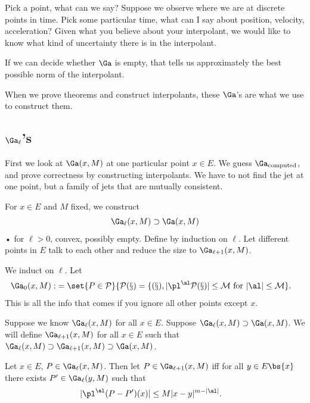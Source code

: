Pick a point, what can we say? Suppose we observe where we are at discrete points in time. Pick some particular time, what can I say about position, velocity, acceleration? %
Given what you believe about your interpolant, we would like to know what kind of uncertainty there is in the interpolant. 

If we can decide whether $\Ga$ is empty, that tells us approximately the best possible norm of the interpolant.

When we prove theorems and construct interpolants, these $\Ga$'s are what we use to construct them. 

\subsection{$\Ga_\ell$'s}

First we look at $\Ga(x,M)$ at one particular point $x\in E$. We guess $\Ga_{\text{computed}}$, and prove correctness by constructing interpolants. We have to not find the jet at one point, but a family of jets that are mutually consistent.

For $x\in E$ and $M$ fixed, we construct
\begin{align}
\Ga_\ell(x,M)\supset \Ga(x,M) 
\end{align}•
for $\ell>0$, convex, possibly empty.
Define by induction on $\ell$. Let different points in $E$ talk to each other and reduce the size to $\Ga_{\ell+1}(x,M)$. 

We induct on $\ell$. Let
\begin{align}
\Ga_0(x,M) :&= \set{P\in \cal P}{P(x)=f(x), |\pl^\al P(x)|\le M\text{ for }|\al|\le M}.
\end{align}
This is all the info that comes if you ignore all other points except $x$.

Suppose we know $\Ga_\ell(x,M)$ for all $x\in E$. Suppose $\Ga_\ell(x,M)\supset \Ga(x,M)$. We will define $\Ga_{\ell+1}(x,M)$ for all $x\in E$ such that $\Ga_\ell(x,M)\supset \Ga_{\ell+1}(x,M)\supset \Ga(x,M)$. 

Let $x\in E$, $P\in \Ga_\ell(x,M)$. Then let $P\in \Ga_{\ell+1}(x,M)$ iff for all $y\in E\bs \{x\}$ there exists $P'\in \Ga_\ell(y,M)$ such that 
\begin{align}
|\pl^\al(P-P')(x)| &\le M |x-y|^{m-|\al|}.
\end{align}

